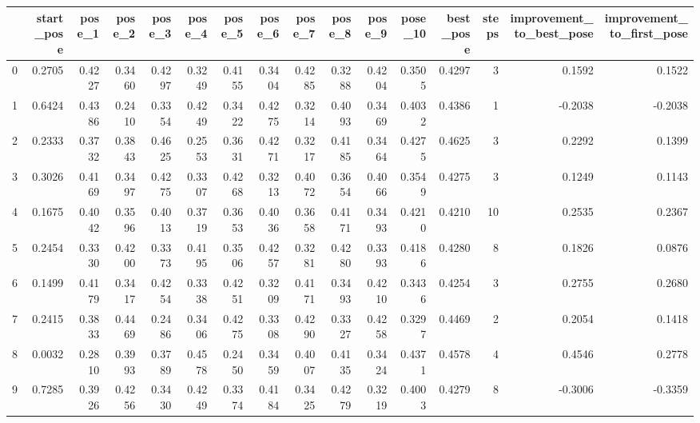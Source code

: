 \begin{tabular}{lrrrrrrrrrrrrrrr}
\toprule
{} &  start\_pose &  pose\_1 &  pose\_2 &  pose\_3 &  pose\_4 &  pose\_5 &  pose\_6 &  pose\_7 &  pose\_8 &  pose\_9 &  pose\_10 &  best\_pose &  steps &  improvement\_to\_best\_pose &  improvement\_to\_first\_pose \\
\midrule
0   &      0.2705 &  0.4227 &  0.3460 &  0.4297 &  0.3249 &  0.4155 &  0.3404 &  0.4285 &  0.3288 &  0.4204 &   0.3505 &     0.4297 &      3 &                    0.1592 &                     0.1522 \\
1   &      0.6424 &  0.4386 &  0.2410 &  0.3354 &  0.4249 &  0.3422 &  0.4275 &  0.3214 &  0.4093 &  0.3469 &   0.4032 &     0.4386 &      1 &                   -0.2038 &                    -0.2038 \\
2   &      0.2333 &  0.3732 &  0.3843 &  0.4625 &  0.2553 &  0.3631 &  0.4271 &  0.3217 &  0.4185 &  0.3464 &   0.4275 &     0.4625 &      3 &                    0.2292 &                     0.1399 \\
3   &      0.3026 &  0.4169 &  0.3497 &  0.4275 &  0.3307 &  0.4268 &  0.3213 &  0.4072 &  0.3654 &  0.4066 &   0.3549 &     0.4275 &      3 &                    0.1249 &                     0.1143 \\
4   &      0.1675 &  0.4042 &  0.3596 &  0.4013 &  0.3719 &  0.3653 &  0.4036 &  0.3658 &  0.4171 &  0.3493 &   0.4210 &     0.4210 &     10 &                    0.2535 &                     0.2367 \\
5   &      0.2454 &  0.3330 &  0.4200 &  0.3373 &  0.4195 &  0.3506 &  0.4257 &  0.3281 &  0.4280 &  0.3393 &   0.4186 &     0.4280 &      8 &                    0.1826 &                     0.0876 \\
6   &      0.1499 &  0.4179 &  0.3417 &  0.4254 &  0.3338 &  0.4251 &  0.3209 &  0.4171 &  0.3493 &  0.4210 &   0.3436 &     0.4254 &      3 &                    0.2755 &                     0.2680 \\
7   &      0.2415 &  0.3833 &  0.4469 &  0.2486 &  0.3406 &  0.4275 &  0.3308 &  0.4290 &  0.3327 &  0.4258 &   0.3297 &     0.4469 &      2 &                    0.2054 &                     0.1418 \\
8   &      0.0032 &  0.2810 &  0.3993 &  0.3789 &  0.4578 &  0.2450 &  0.3459 &  0.4007 &  0.4135 &  0.3424 &   0.4371 &     0.4578 &      4 &                    0.4546 &                     0.2778 \\
9   &      0.7285 &  0.3926 &  0.4256 &  0.3430 &  0.4249 &  0.3374 &  0.4184 &  0.3425 &  0.4279 &  0.3219 &   0.4003 &     0.4279 &      8 &                   -0.3006 &                    -0.3359 \\

\end{tabular}
